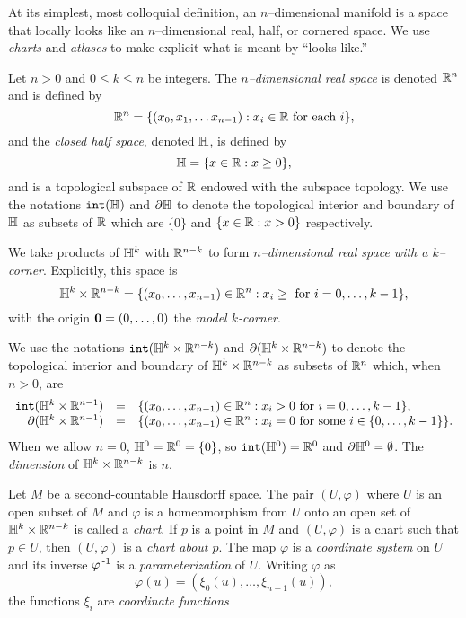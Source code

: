 At its simplest, most colloquial definition, an $n$--dimensional manifold is a space that locally looks like an $n$--dimensional real, half, or cornered space.
We use \emph{charts} and \emph{atlases} to make explicit what is meant by ``looks like.''


\begin{defn}
	Let $n>0$ and $0\leq k\leq n$ be integers.
	The \emph{$n$--dimensional real space} is denoted $\mathbb{R}^n$ and is defined by
	\[
		\mathbb{R}^n=\{(x_0,x_1,\dots x_{n-1}):x_i\in\mathbb{R}\textrm{ for each }i\},
	\]
	and the \emph{closed half space}, denoted $\mathbb{H}$, is defined by
	\[
		\mathbb{H}=\{x\in\mathbb{R}:x\geq 0\},
	\]
	and is a topological subspace of $\mathbb{R}$ endowed with the subspace topology.
	We use the notations $\mathtt{int}(\mathbb{H})$ and $\partial \mathbb{H}$ to denote the topological interior and boundary of $\mathbb{H}$ as subsets of $\mathbb{R}$ which are $\{0\}$ and $\{x\in\mathbb{R}:x>0\}$ respectively.
	
	We take products of $\mathbb{H}^k$ with $\mathbb{R}^{n-k}$ to form \emph{$n$--dimensional real space with a $k$--corner}.
	Explicitly, this space is
	\[
		\mathbb{H}^k\times\mathbb{R}^{n-k} = \{(x_0,\dots,x_{n-1})\in\mathbb{R}^n:x_i\geq\textrm{ for } i=0,\dots,k-1\},
	\]
	with the origin $\mathbf{0}=(0,\dots,0)$ the \emph{model $k$-corner}.
	
	We use the notations $\mathtt{int}(\mathbb{H}^k\times\mathbb{R}^{n-k})$ and $\partial (\mathbb{H}^k\times\mathbb{R}^{n-k})$ to denote the topological interior and boundary of $\mathbb{H}^k\times\mathbb{R}^{n-k}$ as subsets of $\mathbb{R}^n$ which, when $n>0$, are
	\[
	\begin{array}{rcl}
	\mathtt{int}(\mathbb{H}^k\times\mathbb{R}^{n-1}) & = & \{(x_0,\dots,x_{n-1})\in\mathbb{R}^n : x_i > 0\textrm{ for }i=0,\dots,k-1\},\\
	\partial (\mathbb{H}^k\times\mathbb{R}^{n-1})	& = & \{(x_0,\dots,x_{n-1})\in\mathbb{R}^n : x_i = 0\textrm{ for some }i\in\{0,\dots,k-1\}\}.
	\end{array}
	\]
	When we allow $n=0$, $\mathbb{H}^0 = \mathbb{R}^0 = \{0\}$, so $\mathtt{int}(\mathbb{H}^0)=\mathbb{R}^0$ and $\partial\mathbb{H}^0=\emptyset$.
	The \emph{dimension} of $\mathbb{H}^k\times\mathbb{R}^{n-k}$ is $n$.
\end{defn}

\begin{defn}[Coordinates]
	\label{def:coordinates}
	Let $M$ be a second-countable Hausdorff space.
	The pair $(U,\varphi)$ where $U$ is an open subset of $M$ and $\varphi$ is a homeomorphism from $U$ onto an open set of $\mathbb{H}^k\times\mathbb{R}^{n-k}$ is called a \emph{chart}.
	If $p$ is a point in $M$ and $(U,\varphi)$ is a chart such that $p\in U$, then $(U,\varphi)$ is a \emph{chart about $p$}.
	The map $\varphi$ is a \emph{coordinate system} on $U$ and its inverse $\varphi^{\,\text{-}1}$ is a \emph{parameterization} of $U$.
	Writing $\varphi$ as
	\[
		\varphi(u) = (\xi_0(u),\dots,\xi_{n-1}(u)),
	\]
	the functions $\xi_i$ are \emph{coordinate functions}	
\end{defn}

